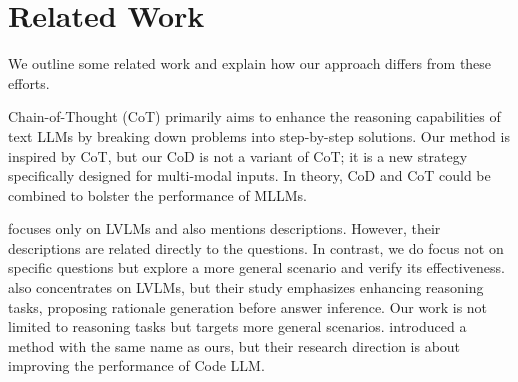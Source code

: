 \section{Related Work}
We outline some related work and explain how our approach differs from these efforts.

Chain-of-Thought \cite{DBLP:conf/nips/Wei0SBIXCLZ22} (CoT) primarily aims to enhance the reasoning capabilities of text LLMs by breaking down problems into step-by-step solutions. Our method is inspired by CoT, but our CoD is not a variant of CoT; it is a new strategy specifically designed for multi-modal inputs. In theory, CoD and CoT could be combined to bolster the performance of MLLMs.

\citet{DBLP:journals/corr/abs-2311-09193} focuses only on LVLMs and also mentions descriptions. However, their descriptions are related directly to the questions. In contrast, we do focus not on specific questions but explore a more general scenario and verify its effectiveness.
\citet{DBLP:journals/tmlr/0001Z00KS24} also concentrates on LVLMs, but their study emphasizes enhancing reasoning tasks, proposing rationale generation before answer inference. Our work is not limited to reasoning tasks but targets more general scenarios. 
\citet{DBLP:conf/mlcad/VijayaraghavanN24} introduced a method with the same name as ours, but their research direction is about improving the performance of Code LLM.